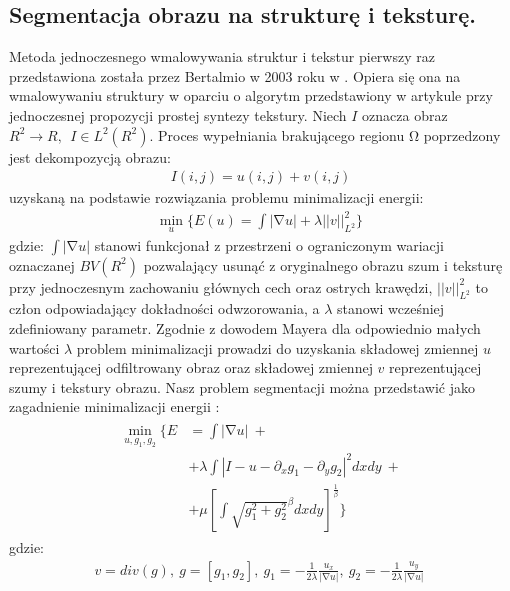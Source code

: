 \documentclass[12pt, twoside, openany]{report}
\theoremstyle{definition}
\begin{document}
\subsection{Segmentacja obrazu na strukturę i teksturę.}
Metoda jednoczesnego wmalowywania struktur i tekstur pierwszy raz przedstawiona została przez Bertalmio w 2003 roku w \cite{NavierStokesAndTexturePropagation}. Opiera się ona na wmalowywaniu struktury w oparciu o algorytm przedstawiony w artykule przy jednoczesnej propozycji prostej syntezy tekstury. Niech $I$ oznacza obraz $R^2\to R,\ \ I\in L^2(R^2)$. Proces wypełniania brakującego regionu $\mathrm{\Omega }$ poprzedzony jest dekompozycją obrazu:
\begin{align}
I\left(i,j\right)=u\left(i,j\right)+v\left(i,j\right) 
\label{STRUCTURETEXTURE1}
\end{align}
uzyskaną na podstawie rozwiązania problemu minimalizacji energii:
\begin{align} 
{\mathop{\mathrm{min}}_{u} \Biggl\{E\left(u\right)=\int{\left|\mathrm{\nabla }u\right|+\lambda {\left|\left|v\right|\right|}^2_{L^2}}\Biggr\}\ }
\label{STRUCTURETEXTURE2}
\end{align}
gdzie: $\int{\left|\mathrm{\nabla }u\right|}$ stanowi funkcjonał z przestrzeni o ograniczonym wariacji oznaczanej $BV(R^2)$ pozwalający usunąć z oryginalnego obrazu szum i teksturę przy jednoczesnym zachowaniu głównych cech oraz ostrych krawędzi, ${\left|\left|v\right|\right|}^2_{L^2}$ to człon odpowiadający dokładności odwzorowania, a $\lambda $ stanowi wcześniej zdefiniowany parametr. Zgodnie z dowodem Mayera \cite{meyer2001oscillating} dla odpowiednio małych wartości $\lambda $ problem minimalizacji prowadzi do uzyskania składowej zmiennej $u$ reprezentującej odfiltrowany obraz oraz składowej zmiennej $v$ reprezentującej szumy i tekstury obrazu. Nasz problem segmentacji można przedstawić jako zagadnienie minimalizacji energii \cite{vese2003modeling}:
\begin{align}
\begin{aligned} 
\mathop{\mathrm{min}}_{u,g_1,g_2} \Biggl\{E &= \int{\left|\mathrm{\nabla }u\right| } \ + \\
&+\lambda \int{\left|I-u-\partial_x g_1- \partial_y g_2 \right|}^2dxdy \ +\\
&+ \mu {\left[\int{{\sqrt{g^2_1+g^2_2}}^\beta dxdy}\right]}^{\frac{1}{\beta}}\Biggr\}
\end{aligned}
\end{align}
gdzie:
\begin{align}
v=div(g),\ g=\left[ g_1,g_2 \right],\ g_1=-\frac{1}{2\lambda }\frac{u_x}{\left|\mathrm{\nabla }u\right|},\ g_2=-\frac{1}{2\lambda }\frac{u_y}{\left|\mathrm{\nabla }u\right|}\
\label{VG1G2}
\end{align}
\end{document}
